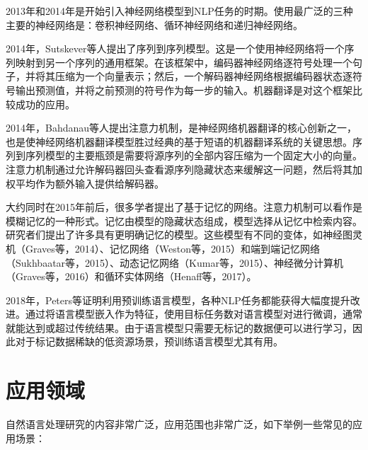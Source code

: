 2013年和2014年是开始引入神经网络模型到NLP任务的时期。使用最广泛的三种主要的神经网络是：卷积神经网络\cite{kim2014convolutional}\cite{kalchbrenner2014convolutional}、循环神经网络\cite{graves2013hybrid}和递归神经网络\cite{socher2013recursive}。

2014年，Sutskever等人提出了序列到序列模型\cite{sutskever2014sequence}。这是一个使用神经网络将一个序列映射到另一个序列的通用框架。在该框架中，编码器神经网络逐符号处理一个句子，并将其压缩为一个向量表示；然后，一个解码器神经网络根据编码器状态逐符号输出预测值，并将之前预测的符号作为每一步的输入。机器翻译是对这个框架比较成功的应用。

2014年，Bahdanau等人提出注意力机制\cite{bahdanau2014neural}，是神经网络机器翻译的核心创新之一，也是使神经网络机器翻译模型胜过经典的基于短语的机器翻译系统的关键思想。序列到序列模型的主要瓶颈是需要将源序列的全部内容压缩为一个固定大小的向量。注意力机制通过允许解码器回头查看源序列隐藏状态来缓解这一问题，然后将其加权平均作为额外输入提供给解码器。

大约同时在2015年前后，很多学者提出了基于记忆的网络。注意力机制可以看作是模糊记忆的一种形式。记忆由模型的隐藏状态组成，模型选择从记忆中检索内容。研究者们提出了许多具有更明确记忆的模型。这些模型有不同的变体，如神经图灵机\cite{graves2014neural}（Graves等，2014）、记忆网络\cite{weston2014memory}（Weston等，2015）和端到端记忆网络\cite{sukhbaatar2015end}（Sukhbaatar等，2015）、动态记忆网络\cite{kumar2016ask}（Kumar等，2015）、神经微分计算机\cite{graves2016hybrid}（Graves等，2016）和循环实体网络\cite{henaff2016tracking}（Henaff等，2017）。

2018年，Peters等证明利用预训练语言模型\cite{conneau2017supervised}\cite{mccann2017learned}\cite{subramanian2018learning}，各种NLP任务都能获得大幅度提升改进。通过将语言模型嵌入作为特征，使用目标任务数对语言模型对进行微调\cite{ramachandran2016unsupervised}\cite{howard2018universal}，通常就能达到或超过传统结果。由于语言模型只需要无标记的数据便可以进行学习，因此对于标记数据稀缺的低资源场景，预训练语言模型尤其有用。

\section{应用领域}
自然语言处理研究的内容非常广泛，应用范围也非常广泛，如下举例一些常见的应用场景：

